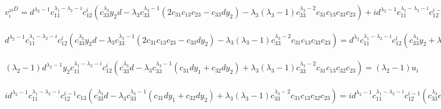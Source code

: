 %
%
$ v_i^{_{23}D} = d^{\lambda_2 - 1} c_{11}^{\lambda_1 - \lambda_2 - i} c_{12}^i (c_{33}^{\lambda_3} y_2 d - \lambda_3 c_{33}^{\lambda_3 - 1} (2 c_{31}c_{13}c_{23} - c_{33} d y_2) - \lambda_3 (\lambda_3 - 1) c_{33}^{\lambda_3 - 2} c_{31}c_{13}c_{33}c_{23}) + i d^{\lambda_2 - 1} c_{11}^{\lambda_1 - \lambda_2 - i} c_{12}^{i - 1} c_{13} (c_{33}^{\lambda_3} d - \lambda_3 c_{33}^{\lambda_3 - 1} (c_{31} d y_1 + c_{32} d y_2) + \lambda_3 (\lambda_3 - 1) c_{33}^{\lambda_3 - 2} c_{31}c_{13}c_{32}c_{23}) + (\lambda_2 - 1) d^{\lambda_2 - 1} y_1 c_{11}^{\lambda_1 - \lambda_2 - i} c_{12}^i (c_{33}^{\lambda_3} d - \lambda_3 c_{33}^{\lambda_3 - 1} (c_{31} d y_1 + c_{32} d y_2) + \lambda_3 (\lambda_3 - 1) c_{33}^{\lambda_3 - 2} c_{31}c_{13}c_{32}c_{23}) = (**) $
\\
\\
$ d^{\lambda_2 - 1} c_{11}^{\lambda_1 - \lambda_2 - i} c_{12}^i (c_{33}^{\lambda_3} y_2 d - \lambda_3 c_{33}^{\lambda_3 - 1} (2 c_{31}c_{13}c_{23} - c_{33} d y_2) - \lambda_3 (\lambda_3 - 1) c_{33}^{\lambda_3 - 2} c_{31}c_{13}c_{33}c_{23}) = d^{\lambda_2} c_{11}^{\lambda_1 - \lambda_2 - i} c_{12}^i (c_{33}^{\lambda_3} y_2 + \lambda_3 c_{33}^{\lambda_3} y_2 - 2 \lambda_3 c_{33}^{\lambda_3 - 1} c_{31} y_1 y_2 - \lambda_3 (\lambda_3 - 1) c_{33}^{\lambda_3 - 1} c_{31} y_1 y_2)
= d^{\lambda_2} c_{11}^{\lambda_1 - \lambda_2 - i} c_{12}^i ( (\lambda_3 + 1) c_{33}^{\lambda_3} y_2 - (\lambda_3 + 1) \lambda_3 c_{33}^{\lambda_3 - 1} c_{31} y_1 y_2) = (\lambda_3 + 1) u_i $
\\
\\
$ (\lambda_2 - 1) d^{\lambda_2 - 1} y_2 c_{11}^{\lambda_1 - \lambda_2 - i} c_{12}^i (c_{33}^{\lambda_3} d - \lambda_3 c_{33}^{\lambda_3 - 1} (c_{31} d y_1 + c_{32} d y_2) + \lambda_3 (\lambda_3 - 1) c_{33}^{\lambda_3 - 2} c_{31}c_{13}c_{32}c_{23}) = (\lambda_2 - 1) u_i $
\\
\\
$ i d^{\lambda_2 - 1} c_{11}^{\lambda_1 - \lambda_2 - i} c_{12}^{i - 1} c_{13} (c_{33}^{\lambda_3} d - \lambda_3 c_{33}^{\lambda_3 - 1} (c_{31} d y_1 + c_{32} d y_2) + \lambda_3 (\lambda_3 - 1) c_{33}^{\lambda_3 - 2} c_{31}c_{13}c_{32}c_{23}) = i d^{\lambda_2 - 1} c_{11}^{\lambda_1 - \lambda_2 - i} c_{12}^{i - 1} (c_{33}^{\lambda_3} c_{13} - \lambda_3 c_{33}^{\lambda_3 - 1} c_{13} (c_{31} y_1 + c_{32} y_2)) = i d^{\lambda_2 - 1} c_{11}^{\lambda_1 - \lambda_2 - i} c_{12}^{i - 1} c_{33}^{\lambda_3} c_{13} + i d^{\lambda_2 - 1} c_{11}^{\lambda_1 - \lambda_2 - i + 1} c_{12}^{i - 1} (- \lambda_3 c_{33}^{\lambda_3 - 1} c_{32} y_2 y_1) + i d^{\lambda_2 - 1} c_{11}^{\lambda_1 - \lambda_2 - i} c_{12}^i (- \lambda_3 c_{33}^{\lambda_3 - 1} c_{32} y_1 y_2) = i d^{\lambda_2 - 1} c_{11}^{\lambda_1 - \lambda_2 - i} c_{12}^{i - 1} c_{33}^{\lambda_3} c_{13} + i w_{i - 1} - i d^{\lambda_2 - 1} c_{11}^{\lambda_1 - \lambda_2 - i + 1} c_{12}^{i - 1} c_{33}^{\lambda_3} y_1 + i u_i - i d^{\lambda_2 - 1} c_{11}^{\lambda_1 - \lambda_2 - i} c_{12}^i c_{33}^{\lambda_3} y_2 = i w_{i - 1} + i u_i + i d^{\lambda_2 - 1} c_{11}^{\lambda_1 - \lambda_2 - i} c_{12}^{i - 1} c_{33}^{\lambda_3} (c_{13} - c_{11} y_1 - c_{12} y_2) = i w_{i - 1} + i u_i $
